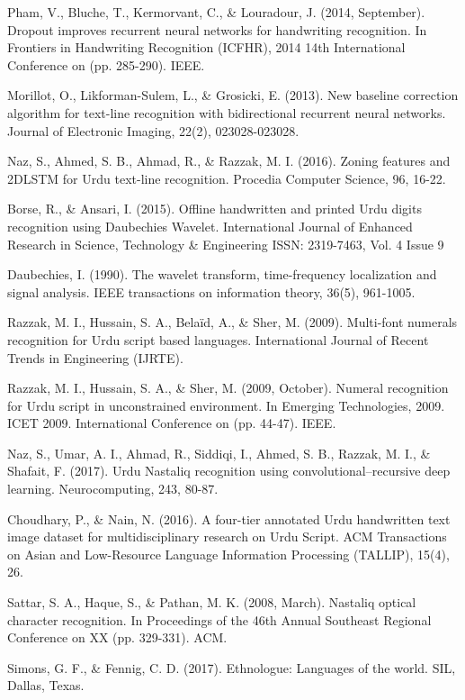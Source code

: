 \documentclass[a4paper,conference]{IEEEtran}
\begin{document}
\begin{thebibliography}{130}
Pham, V., Bluche, T., Kermorvant, C., \& Louradour, J. (2014, September). Dropout improves recurrent neural networks for handwriting recognition. In Frontiers in Handwriting Recognition (ICFHR), 2014 14th International Conference on (pp. 285-290). IEEE.

Morillot, O., Likforman-Sulem, L., \& Grosicki, E. (2013). New baseline correction algorithm for text-line recognition with bidirectional recurrent neural networks. Journal of Electronic Imaging, 22(2), 023028-023028.

Naz, S., Ahmed, S. B., Ahmad, R., \& Razzak, M. I. (2016). Zoning features and 2DLSTM for Urdu text-line recognition. Procedia Computer Science, 96, 16-22.

Borse, R., \& Ansari, I. (2015). Offline handwritten and printed Urdu digits recognition using Daubechies Wavelet. International Journal of Enhanced Research in Science, Technology \& Engineering
ISSN: 2319-7463, Vol. 4 Issue 9

Daubechies, I. (1990). The wavelet transform, time-frequency localization and signal analysis. IEEE transactions on information theory, 36(5), 961-1005.

Razzak, M. I., Hussain, S. A., Belaïd, A., \& Sher, M. (2009). Multi-font numerals recognition for Urdu script based languages. International Journal of Recent Trends in Engineering (IJRTE).

Razzak, M. I., Hussain, S. A., \& Sher, M. (2009, October). Numeral recognition for Urdu script in unconstrained environment. In Emerging Technologies, 2009. ICET 2009. International Conference on (pp. 44-47). IEEE.

Naz, S., Umar, A. I., Ahmad, R., Siddiqi, I., Ahmed, S. B., Razzak, M. I., \& Shafait, F. (2017). Urdu Nastaliq recognition using convolutional–recursive deep learning. Neurocomputing, 243, 80-87.

Choudhary, P., \& Nain, N. (2016). A four-tier annotated Urdu handwritten text image dataset for multidisciplinary research on Urdu Script. ACM Transactions on Asian and Low-Resource Language Information Processing (TALLIP), 15(4), 26.

Sattar, S. A., Haque, S., \& Pathan, M. K. (2008, March). Nastaliq optical character recognition. In Proceedings of the 46th Annual Southeast Regional Conference on XX (pp. 329-331). ACM.

Simons, G. F., \& Fennig, C. D. (2017). Ethnologue: Languages of the world. SIL, Dallas, Texas.


\end{thebibliography}
\end{document}
